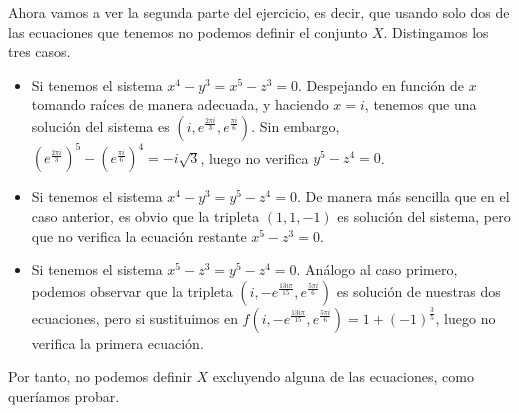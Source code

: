 \documentclass[twoside]{article}
\begin{document}
\begin{ejercicio}{6}
\begin{solucion}
\begin{enumerate}
Ahora vamos a ver la segunda parte del ejercicio, es decir, que usando solo dos de las ecuaciones que tenemos no podemos definir el conjunto $X$. Distingamos los tres casos.
\begin{itemize}
\item Si tenemos el sistema $x^4-y^3=x^5-z^3= 0$. Despejando en función de $x$ tomando raíces de manera adecuada, y haciendo $x=i$, tenemos que una solución del sistema es $(i,e^{\frac{2\pi i}{3}},e^{\frac{\pi i}{6}})$. Sin embargo, $\left(e^{\frac{2\pi i}{3}}\right)^5-\left(e^{\frac{\pi i}{6}}\right)^4 = -i\sqrt{3}$, luego no verifica $y^5-z^4 =0$.
\item Si tenemos el sistema $x^4-y^3 = y^5 - z^4=0$. De manera más sencilla que en el caso anterior, es obvio que la tripleta $(1,1,-1)$ es solución del sistema, pero que no verifica la ecuación restante $x^5-z^3=0$.
\item Si tenemos el sistema $x^5-z^3 = y^5 - z^4=0$. Análogo al caso primero, podemos observar que la tripleta $(i,-e^{\frac{13i\pi}{15}},e^{\frac{5\pi i}{6}})$ es solución de nuestras dos ecuaciones, pero si sustituimos en $f(i,-e^{\frac{13i\pi}{15}},e^{\frac{5\pi i}{6}}) = 1+(-1)^{\frac{3}{5}}$, luego no verifica la primera ecuación.
\end{itemize}
Por tanto, no podemos definir $X$ excluyendo alguna de las ecuaciones, como queríamos probar.
\end{enumerate}
\end{solucion}
\end{ejercicio}
\end{document}
